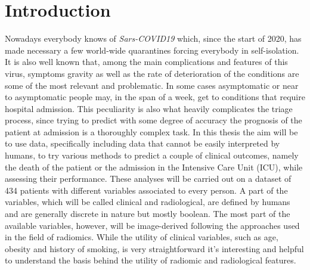 \chapter{Introduction}
\vspace*{0.5cm}
\setcounter{page}{1}


Nowadays everybody knows of  \textit{Sars-COVID19} which, since the start of 2020, has made necessary a few world-wide quarantines forcing everybody in self-isolation. It is also well known that, among the main complications and features of this virus, symptoms gravity as well as the rate of deterioration of the conditions are some of the most relevant and problematic. In some cases asymptomatic or near to asymptomatic people may, in the span of a week, get to conditions that require hospital admission. This peculiarity is also what heavily complicates the triage process, since trying to predict with some degree of accuracy the prognosis of the patient at admission is a thoroughly complex task. In this thesis the aim will be to use data, specifically including data that cannot be easily interpreted by humans, to try various methods to predict a couple of clinical outcomes, namely the death of the patient or the admission in the Intensive Care Unit (ICU), while assessing their performance. These analyses will be carried out on a dataset of 434 patients with different variables associated to every person. A part of the variables, which will be called clinical and radiological, are defined by humans and are generally discrete in nature but mostly boolean. The most part of the available variables, however, will be image-derived following the approaches used in the field of radiomics. While the utility of clinical variables, such as age, obesity and history of smoking, is very straightforward it's interesting and helpful to understand the basis behind the utility of radiomic and radiological features.


